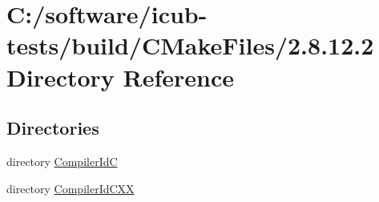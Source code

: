 \section{C\+:/software/icub-\/tests/build/\+C\+Make\+Files/2.8.12.2 Directory Reference}
\label{dir_da9d1f60b22a094d3f39025147373af5}
\subsection*{Directories}
\begin{DoxyCompactItemize}
\item 
directory \hyperlink{dir_810fa0f3751972e5d9f41a4c273724ff}{Compiler\+Id\+C}
\item 
directory \hyperlink{dir_3c20749e46078323b537ef82e32dbf1e}{Compiler\+Id\+C\+X\+X}
\end{DoxyCompactItemize}
